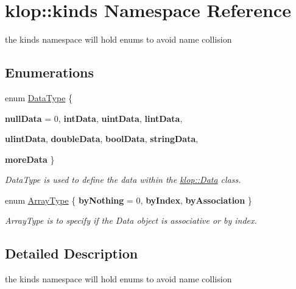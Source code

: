 \hypertarget{namespaceklop_1_1kinds}{
\section{klop::kinds Namespace Reference}
\label{namespaceklop_1_1kinds}
}


the kinds namespace will hold enums to avoid name collision  


\subsection*{Enumerations}
\begin{DoxyCompactItemize}
\item 
enum \hyperlink{namespaceklop_1_1kinds_acddfa6fd45450d8db3eb8c288d03202b}{DataType} \{ \par
{\bfseries nullData} =  0, 
{\bfseries intData}, 
{\bfseries uintData}, 
{\bfseries lintData}, 
\par
{\bfseries ulintData}, 
{\bfseries doubleData}, 
{\bfseries boolData}, 
{\bfseries stringData}, 
\par
{\bfseries moreData}
 \}
\begin{DoxyCompactList}\small\item\em DataType is used to define the data within the \hyperlink{classklop_1_1Data}{klop::Data} class. \item\end{DoxyCompactList}\item 
enum \hyperlink{namespaceklop_1_1kinds_aca835f7cfa300361cd67d6248b41ccd0}{ArrayType} \{ {\bfseries byNothing} =  0, 
{\bfseries byIndex}, 
{\bfseries byAssociation}
 \}
\begin{DoxyCompactList}\small\item\em ArrayType is to specify if the Data object is associative or by index. \item\end{DoxyCompactList}\end{DoxyCompactItemize}


\subsection{Detailed Description}
the kinds namespace will hold enums to avoid name collision 